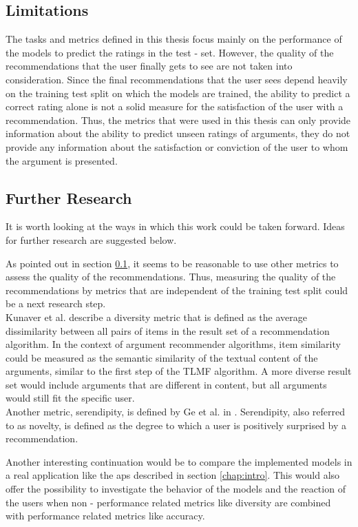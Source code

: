\subsection{Limitations}
\label{chap:limits}
The tasks and metrics defined in this thesis focus mainly on the performance of the models to predict the ratings in the test - set. However, the quality of the recommendations that the user finally gets to see are not taken into consideration. Since the final recommendations that the user sees depend heavily on the training test split on which the models are trained, the ability to predict a correct rating alone is not a solid measure for the satisfaction of the user with a recommendation. Thus, the metrics that were used in this thesis can only provide information about the ability to predict unseen ratings of arguments, they do not provide any information about the satisfaction or conviction of the user to whom the argument is presented.  

\subsection{Further Research}
It is worth looking at the ways in which this work could be taken forward. Ideas for further research are suggested below. 

As pointed out in section \ref{chap:limits}, it seems to be reasonable to use other metrics to assess the quality of the recommendations. Thus, measuring the quality of the recommendations by metrics that are independent of the training test split could be a next research step.\\
Kunaver et al. \cite{kunaver2017diversity} describe a diversity metric that is defined as the average dissimilarity between all pairs of items in the result set of a recommendation algorithm. In the context of argument recommender algorithms, item similarity could be measured as the semantic similarity of the textual content of the arguments, similar to the first step of the TLMF algorithm. A more diverse result set would include arguments that are different in content, but all arguments would still fit the specific user.\\ 
Another metric, serendipity, is defined by Ge et al. in \cite{ge2010beyond}. 
Serendipity, also referred to as novelty, is defined as the degree to which a user is positively surprised by a recommendation.

Another interesting continuation would be to compare the implemented models in a real application like the \acrshort{aps} described in section \ref{chap:intro}. This would also offer the possibility to investigate the behavior of the models and the reaction of the users when non - performance related metrics like diversity are combined with performance related metrics like accuracy.

